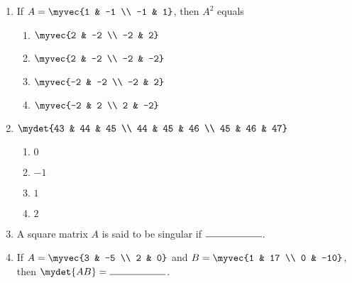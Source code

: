 %
\begin{enumerate}
    \item If $A = \myvec{1 & -1 \\ -1 & 1}$, then $A^2$ equals
    \begin{enumerate}
        \item $\myvec{2 & -2 \\ -2 & 2}$
        \item $\myvec{2 & -2 \\ -2 & -2}$
        \item $\myvec{-2 & -2 \\ -2 & 2}$
        \item $\myvec{-2 & 2 \\ 2 & -2}$
    \end{enumerate}

   \item
    $\mydet{43 & 44 & 45 \\ 44 & 45 & 46 \\ 45 & 46 & 47}$
    \begin{enumerate}
        \item $0$
        \item $-1$
        \item $1$
        \item $2$
    \end{enumerate}

    \item A square matrix $A$ is said to be singular if $\rule{2cm}{0.15mm}$.

    \item If $A =\myvec{3 & -5 \\ 2 & 0}$ and 
    $B = \myvec{1 & 17 \\ 0 & -10}$, then $\mydet{AB} = \rule{2cm}{0.15mm}$.

    
\end{enumerate}
%
